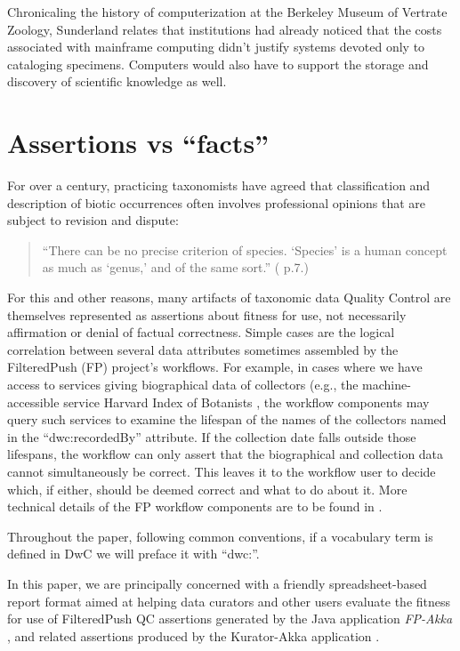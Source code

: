 \documentclass{article}
\begin{document}
Chronicaling the history of computerization at the Berkeley Museum of Vertrate Zoology, Sunderland \citep{Sunderland2013150} relates that institutions had already noticed that the costs associated with mainframe computing didn't justify systems devoted only to cataloging specimens. Computers would also have to support the storage and discovery of scientific knowledge as well.  

\section{Assertions vs “facts”}
For over a century, practicing taxonomists have agreed that classification and description of biotic occurrences often involves professional opinions that are subject to revision and dispute:
\begin{quotation}
``There can be no precise criterion of species. `Species' is a human concept as much as `genus,' and of the same sort.'' (\citep{lutz_variation_1908} p.7.)
\end{quotation}

For this and other reasons, many artifacts of taxonomic data Quality Control are themselves represented as assertions about fitness for use, not necessarily affirmation or denial of factual correctness. Simple cases are the logical correlation between several data attributes sometimes assembled by the FilteredPush (FP) \citep{filteredpushWeb_2016} project's workflows. For example, in cases where we have access to services giving biographical data of collectors (e.g., the machine-accessible service Harvard Index of Botanists \citep{harvard_university_herbaria_&_libraries_index_2013}, the workflow components may query such services to examine the lifespan of the names of the collectors named in the “dwc:recordedBy” attribute. If the collection date falls outside those lifespans, the workflow can only assert that the biographical and collection data cannot simultaneously be correct. This leaves it to the workflow user to decide which, if either, should be deemed correct and what to do about it. More technical details of the FP workflow components are to be found in \citep{song_towards_2014}.

Throughout the paper, following common conventions, if a vocabulary term is defined in DwC we will preface it with ``dwc:''.


In this paper, we are principally concerned with a friendly spreadsheet-based report format aimed at helping data curators and other users evaluate the fitness for use of FilteredPush QC assertions generated by the Java application \emph{FP-Akka} \cite{FilteredPushWiki}, and related assertions produced by the Kurator-Akka application \citep{kurator_akka} .
\end{document}
